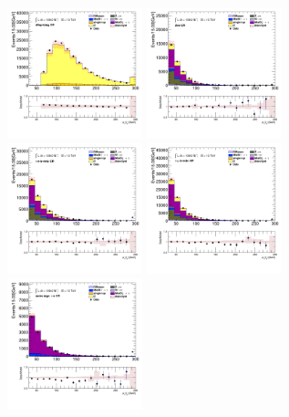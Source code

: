 		\begin{figure}[!htp]
			\begin{center}    
			\includegraphics[width=0.35\textwidth]{chapters/chapter6_HPlus/images/taulep/lep_0_pt_DILEP_BTAG.png}
			\includegraphics[width=0.35\textwidth]{chapters/chapter6_HPlus/images/taulep/lep_0_pt_ZEE.png} \\
			\includegraphics[width=0.35\textwidth]{chapters/chapter6_HPlus/images/taulep/lep_0_pt_TAUEL_BVETO.png} 
			\includegraphics[width=0.35\textwidth]{chapters/chapter6_HPlus/images/taulep/lep_0_pt_TAUMU_BVETO.png} \\
			\includegraphics[width=0.35\textwidth]{chapters/chapter6_HPlus/images/taulep/lep_0_pt_SS_TAUEL.png} 

\end{center}
\end{figure}
